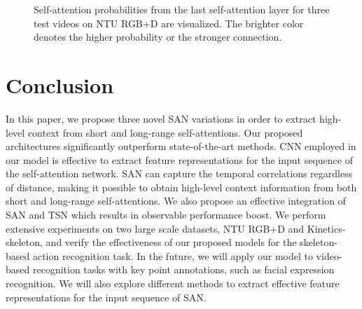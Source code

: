\documentclass[10pt,twocolumn,letterpaper]{article}
\begin{document}
\begin{figure}[!t]
	\centering
	\vspace{0.7em} 

	\vspace{0.7em}

	\caption{
		Self-attention probabilities from the last self-attention layer for three test videos on NTU RGB+D are visualized. The brighter color denotes the higher probability or the stronger connection. }
	\label{fig:vis}
\end{figure}








\section{Conclusion}
In this paper, we propose three novel SAN variations in order to extract high-level context from short and long-range self-attentions. Our proposed architectures significantly outperform state-of-the-art methods.
CNN employed in our model is effective to extract feature representations for the input sequence of the self-attention network.
SAN can capture the temporal correlations regardless of distance, making it possible to obtain high-level context information from both short and long-range self-attentions.
We also propose an effective integration of SAN and TSN which results in observable performance boost.
We perform extensive experiments on two large scale datasets, NTU RGB+D and Kinetics-skeleton, and verify the effectiveness of our proposed models for the skeleton-based action recognition task. 
In the future, we will apply our model to video-based recognition tasks with key point annotations, such as facial expression recognition. We will also explore different methods to extract effective feature representations for the input sequence of SAN.



{\small


}
\end{document}
